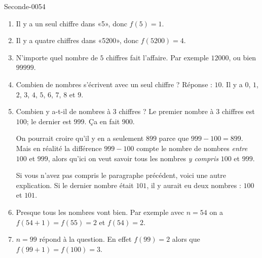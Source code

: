 
\begin{corrige}{Seconde-0054}

    \begin{enumerate}
        \item
            Il y a un seul chiffre dans «5», donc \( f(5)=1\).
        \item
            Il y a quatre chiffres dans «5200», donc \( f(5200)=4\).
        \item
            N'importe quel nombre de \( 5\) chiffres fait l'affaire. Par exemple \( 12000\), ou bien \( 99999\).
        \item
            Combien de nombres s'écrivent avec un seul chiffre ? Réponse : \( 10\). Il y a \( 0\), \( 1\), \( 2\), \( 3\), \( 4\), \( 5\), \( 6\), \( 7\), \( 8\) et \( 9\).
        \item   \label{ItemBgoyXw}
            Combien y a-t-il de nombres à $3$ chiffres ? Le premier nombre à \( 3\) chiffres est \( 100\); le dernier est \( 999\). Ça en fait \( 900\).

            On pourrait croire qu'il y en a seulement \( 899\) parce que \( 999-100=899\). Mais en réalité la différence \( 999-100\) compte le nombre de nombres \emph{entre} \( 100\) et \( 999\), alors qu'ici on veut savoir tous les nombres \emph{y compris} \( 100\) et \( 999\).

            Si vous n'avez pas compris le paragraphe précédent, voici une autre explication. Si le dernier nombre était \( 101\), il y aurait eu deux nombres : \( 100\) et \( 101\).
        \item
            Presque tous les nombres vont bien. Par exemple avec \( n=54\) on a \( f(54+1)=f(55)=2\) et \( f(54)=2\).
        \item
            \( n=99\) répond à la question. En effet \( f(99)=2\) alors que \( f(99+1)=f(100)=3\).
    \end{enumerate}
\end{corrige}
